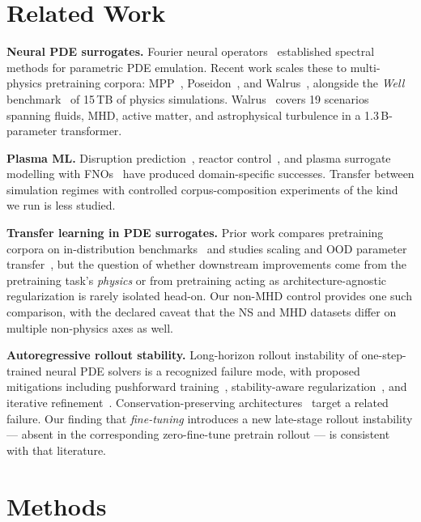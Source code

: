 \documentclass{article}
\begin{document}
\section{Related Work}

\textbf{Neural PDE surrogates.} Fourier neural operators~\cite{li2020fno} established spectral methods for parametric PDE emulation. Recent work scales these to multi-physics pretraining corpora: MPP~\cite{mccabe2024multiple}, Poseidon~\cite{herde2024poseidon}, and Walrus~\cite{mccabe2025walrus}, alongside the \emph{Well} benchmark~\cite{ohana2024well} of 15\,TB of physics simulations. Walrus~\cite{mccabe2025walrus} covers 19 scenarios spanning fluids, MHD, active matter, and astrophysical turbulence in a 1.3\,B-parameter transformer.

\textbf{Plasma ML.} Disruption prediction~\cite{katesharbeck2019deep}, reactor control~\cite{degrave2022magnetic,seo2024avoiding}, and plasma surrogate modelling with FNOs~\cite{gopakumar2024plasma} have produced domain-specific successes. Transfer between simulation regimes with controlled corpus-composition experiments of the kind we run is less studied.

\textbf{Transfer learning in PDE surrogates.} Prior work compares pretraining corpora on in-distribution benchmarks~\cite{mccabe2024multiple,herde2024poseidon} and studies scaling and OOD parameter transfer~\cite{subramanian2023foundation}, but the question of whether downstream improvements come from the pretraining task's \emph{physics} or from pretraining acting as architecture-agnostic regularization is rarely isolated head-on. Our non-MHD control provides one such comparison, with the declared caveat that the NS and MHD datasets differ on multiple non-physics axes as well.

\textbf{Autoregressive rollout stability.} Long-horizon rollout instability of one-step-trained neural PDE solvers is a recognized failure mode, with proposed mitigations including pushforward training~\cite{brandstetter2022pushforward}, stability-aware regularization~\cite{mccabe2023stability}, and iterative refinement~\cite{lippe2023pderefiner}. Conservation-preserving architectures~\cite{liu2024conservation,richterpowell2022neural} target a related failure. Our finding that \emph{fine-tuning} introduces a new late-stage rollout instability --- absent in the corresponding zero-fine-tune pretrain rollout --- is consistent with that literature.

\section{Methods}
\end{document}

